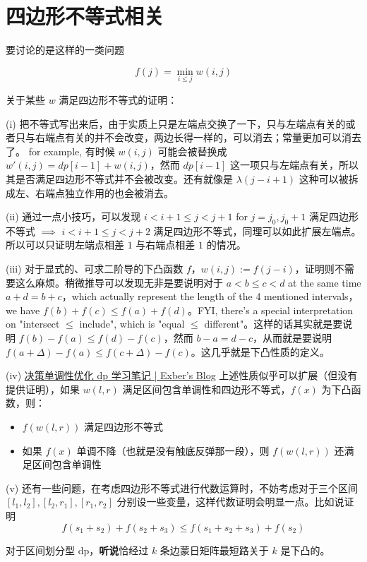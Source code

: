 \section{四边形不等式相关}

要讨论的是这样的一类问题

$$
f(j) = \min_{i\le j}  w(i,j)
$$

关于某些 $w$ 满足四边形不等式的证明：

(i) 
把不等式写出来后，由于实质上只是左端点交换了一下，只与左端点有关的或者只与右端点有关的并不会改变，两边长得一样的，可以消去；常量更加可以消去了。
for example, 有时候 $w(i,j)$ 可能会被替换成 $w'(i,j) = dp[i-1] + w(i,j)$，然而 $dp[i-1]$ 这一项只与左端点有关，所以其是否满足四边形不等式并不会被改变。还有就像是 $\lambda(j-i+1)$ 这种可以被拆成左、右端点独立作用的也会被消去。

(ii)
通过一点小技巧，可以发现 $i<i+1\le j < j+1$ for $j=j_0,j_0+1$ 满足四边形不等式 $\implies$ $i<i+1\le j < j+2$ 满足四边形不等式，同理可以如此扩展左端点。
所以可以只证明左端点相差 $1$ 与右端点相差 $1$ 的情况。

(iii)
对于显式的、可求二阶导的下凸函数 $f$，$w(i,j) := f(j-i)$，证明则不需要这么麻烦。稍微推导可以发现无非是要说明对于 $a< b\le c< d$ at the same time $a+d = b+c$，which actually represent the length of the 4 mentioned intervals，we have $f(b) + f(c) \le f(a)+f(d)$。FYI, there's a special interpretation on "intersect $\le$ include", which is "equal $\le$ different"。这样的话其实就是要说明 $f(b) - f(a) \le f(d) - f(c)$，然而 $b-a = d-c$，从而就是要说明 $f(a+\Delta) - f(a) \le f(c+\Delta) - f(c)$。这几乎就是下凸性质的定义。

(iv)
\href{https://rebxe.github.io/post/jue-ce-dan-diao-xing-you-hua-dp-xue-xi-bi-ji/}{决策单调性优化 dp 学习笔记 | Exber's Blog}
上述性质似乎可以扩展（但没有提供证明），如果 $w(l,r)$ 满足区间包含单调性和四边形不等式，$f(x)$ 为下凸函数，则：
\begin{itemize}
    \item $f(w(l,r))$ 满足四边形不等式
    \item 如果 $f(x)$ 单调不降（也就是没有触底反弹那一段），则 $f(w(l,r))$ 还满足区间包含单调性
\end{itemize}

(v)
还有一些问题，在考虑四边形不等式进行代数运算时，不妨考虑对于三个区间 $[l_1,l_2],[l_2,r_1],[r_1,r_2]$ 分别设一些变量，这样代数证明会明显一点。比如说证明
$$
f(s_1+s_2) + f(s_2+s_3) \le f(s_1+s_2+s_3) + f(s_2)
$$

对于区间划分型 dp，\textbf{听说}恰经过 $k$ 条边蒙日矩阵最短路关于 $k$ 是下凸的。
